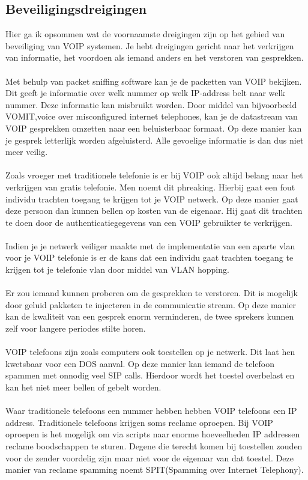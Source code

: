 \documentclass[pdftex,a4paper,12pt,twoside]{report}
\begin{document}
\subsection{Beveiligingsdreigingen}
Hier ga ik opsommen wat de voornaamste dreigingen zijn op het gebied van beveiliging van VOIP systemen. Je hebt dreigingen gericht naar het verkrijgen van informatie, het voordoen als iemand anders en het verstoren van gesprekken. 
\\ \\
Met behulp van packet sniffing software kan je de packetten van VOIP bekijken. Dit geeft je informatie over welk nummer op welk IP-address belt naar welk nummer. Deze informatie kan misbruikt worden. Door middel van bijvoorbeeld VOMIT,voice over misconfigured internet telephones, kan je de datastream van VOIP gesprekken omzetten naar een beluisterbaar formaat. 	Op deze manier kan je gesprek letterlijk worden afgeluisterd. Alle gevoelige informatie is dan dus niet meer veilig.
\\ \\
Zoals vroeger met traditionele telefonie is er bij VOIP ook altijd belang naar het verkrijgen van gratis telefonie. Men noemt dit phreaking. Hierbij gaat een fout individu trachten toegang te krijgen tot je VOIP netwerk. Op deze manier gaat deze persoon dan kunnen bellen op kosten van de eigenaar. Hij gaat dit trachten te doen door de authenticatiegegevens van een VOIP 		gebruikter te verkrijgen.
\\ \\
 Indien je je netwerk veiliger maakte met de implementatie van een aparte vlan voor je VOIP telefonie is er de kans dat een individu gaat trachten toegang te krijgen tot je telefonie vlan door middel van VLAN hopping. 
\\ \\
 Er zou iemand kunnen proberen om de gesprekken te verstoren. Dit is mogelijk door geluid pakketen te injecteren in de communicatie stream. Op deze manier kan de kwaliteit van een gesprek enorm verminderen, de twee sprekers kunnen zelf voor langere periodes stilte horen.
\\ \\
VOIP telefoons zijn zoals computers ook toestellen op je netwerk. Dit laat hen kwetsbaar voor een DOS aanval. Op deze manier kan iemand de telefoon spammen met onnodig veel SIP calls. Hierdoor wordt het toestel overbelast en kan het niet meer bellen of gebelt worden.
\\ \\
Waar traditionele telefoons een nummer hebben hebben VOIP telefoons een IP address. Traditionele telefoons krijgen soms reclame oproepen. Bij VOIP oproepen is het mogelijk om via scripts naar enorme hoeveelheden IP addressen reclame boodschappen te sturen. Degene die terecht  komen bij toestellen zouden voor de zender voordelig zijn maar niet voor de eigenaar van dat toestel. Deze manier van reclame spamming noemt SPIT(Spamming over Internet Telephony).
\end{document}

